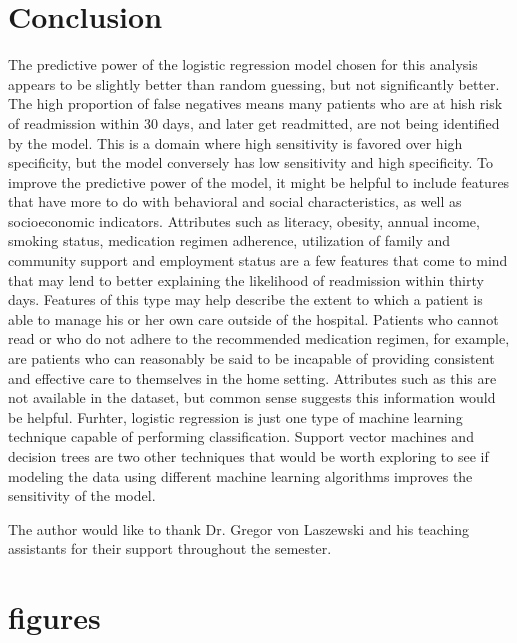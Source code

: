 \documentclass[sigconf]{acmart}
\begin{document}
\section{Conclusion}

The predictive power of the logistic regression model chosen for this analysis appears to be slightly better than random guessing, but not significantly better. The high proportion of false negatives means many patients who are at hish risk of readmission within 30 days, and later get readmitted, are not being identified by the model. This is a domain where high sensitivity is favored over high specificity, but the model conversely has low sensitivity and high specificity. To improve the predictive power of the model, it might be helpful to include features that have more to do with behavioral and social characteristics, as well as socioeconomic indicators. Attributes such as literacy, obesity, annual income, smoking status, medication regimen adherence, utilization of family and community support and employment status are a few features that come to mind that may lend to better explaining the likelihood of readmission within thirty days. Features of this type may help describe the extent to which a patient is able to manage his or her own care outside of the hospital. Patients who cannot read or who do not adhere to the recommended medication regimen, for example, are patients who can reasonably be said to be incapable of providing consistent and effective care to themselves in the home setting. Attributes such as this are not available in the dataset, but common sense suggests this information would be helpful. 
Furhter, logistic regression is just one type of machine learning technique capable of performing classification. Support vector machines and decision trees are two other techniques that would be worth exploring to see if modeling the data using different machine learning algorithms improves the sensitivity of the model.

\begin{acks}

The author would like to thank Dr. Gregor von Laszewski and his teaching assistants for their support throughout the semester.

\end{acks}




\section{figures}
\end{document}
